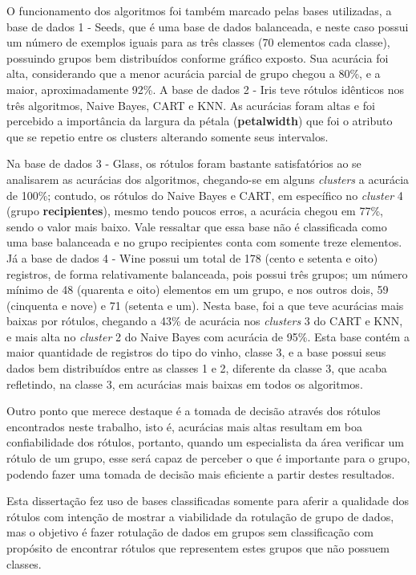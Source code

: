 O funcionamento dos algoritmos foi também marcado pelas bases utilizadas, a base de dados 1 - Seeds, que é uma base de dados balanceada, e neste caso possui um número de exemplos iguais para as três classes (70 elementos cada classe), possuindo grupos bem distribuídos conforme gráfico exposto. Sua acurácia foi alta, considerando que a menor acurácia parcial de grupo chegou a 80\%, e a maior, aproximadamente 92\%. A base de dados 2 - Iris teve rótulos idênticos nos três algoritmos, Naive Bayes, CART e KNN. As acurácias foram altas e foi percebido a importância da largura da pétala (\textbf{petalwidth}) que foi o atributo que se repetio entre os clusters alterando somente seus intervalos.

Na base de dados 3 - Glass, os rótulos foram bastante satisfatórios ao se analisarem as acurácias dos algoritmos, chegando-se em alguns \textit{clusters} a acurácia de 100\%; contudo, os rótulos do Naive Bayes e CART, em específico no \textit{cluster} 4 (grupo \textbf{recipientes}), mesmo tendo poucos erros, a acurácia chegou em 77\%, sendo o valor mais baixo. Vale ressaltar que essa base não é classificada como uma base balanceada e no grupo recipientes conta com somente treze elementos. Já a base de dados 4 - Wine possui um total de 178 (cento e setenta e oito) registros, de  forma relativamente balanceada, pois possui três grupos; um número mínimo de 48 (quarenta e oito) elementos em um grupo, e nos outros dois, 59 (cinquenta e nove) e 71 (setenta e um). Nesta base, foi a que teve acurácias mais baixas por rótulos, chegando a 43\% de acurácia nos \textit{clusters} 3 do CART e KNN, e mais alta no \textit{cluster} 2 do Naive Bayes com acurácia de 95\%.
Esta base contém a maior quantidade de registros do tipo do vinho, classe 3, e a base possui seus dados bem distribuídos entre as classes 1 e 2, diferente da classe 3, que acaba refletindo, na classe 3, em acurácias mais baixas em todos os algoritmos.

Outro ponto que merece destaque é a tomada de decisão através dos rótulos encontrados neste trabalho, isto é, acurácias mais altas resultam em boa confiabilidade dos rótulos, portanto, quando um especialista da área verificar um rótulo de um grupo, esse será capaz de perceber o que é importante para o grupo, podendo fazer uma tomada de decisão mais eficiente a partir destes resultados. 

Esta dissertação fez uso de bases classificadas somente para aferir a qualidade dos rótulos com intenção de mostrar a viabilidade da rotulação de grupo de dados, mas o   objetivo é fazer rotulação de dados em grupos sem classificação com propósito de encontrar rótulos que representem estes grupos que não possuem classes.


